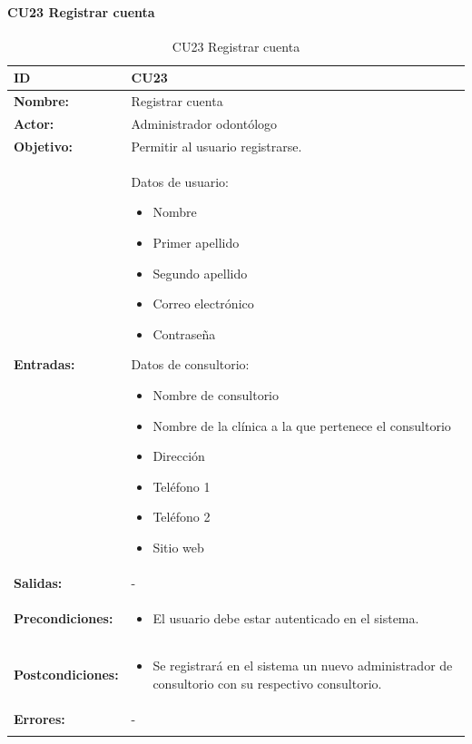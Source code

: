 
\paragraph{CU23 Registrar cuenta}

\begin{longtable}[H]{|p{}|p{12cm}|}
\hline\textbf{ID}         
& \textbf{CU23}            \\ \hline
\textbf{Nombre:}          
& Registrar cuenta      \\ \hline
\textbf{Actor:}          
& Administrador odontólogo   \\ \hline
\textbf{Objetivo:}       
& Permitir al usuario registrarse.\\ \hline
\textbf{Entradas:}  & 
Datos de usuario:
\begin{itemize}[nosep]
\item Nombre
\item Primer apellido
\item Segundo apellido
\item Correo electrónico
\item Contraseña
\end{itemize}
Datos de consultorio:
\begin{itemize}[nosep]
\item Nombre de consultorio
\item Nombre de la clínica a la que pertenece el consultorio
\item Dirección
\item Teléfono 1
\item Teléfono 2
\item Sitio web
\end{itemize}
\\ \hline
\textbf{Salidas:}  & -
\\ \hline
\textbf{Precondiciones:}  &             
\begin{itemize}[nosep]
\item El usuario debe estar autenticado en el sistema.
\end{itemize}
\\ \hline
\textbf{Postcondiciones:} & 
\begin{itemize}[nosep]
\item Se registrará en el sistema un nuevo administrador de consultorio con su respectivo consultorio.
\end{itemize}
\\ \hline
\textbf{Errores:} &  -
\\ \hline
\caption{CU23 Registrar cuenta}
\label{table:1}
\end{longtable}

